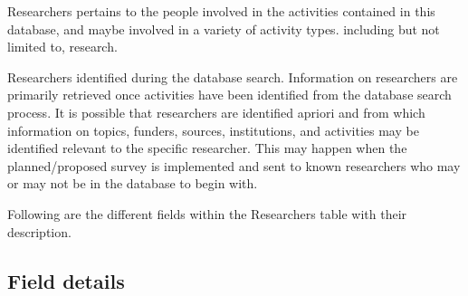 \documentclass[
]{book}
\begin{document}
Researchers pertains to the people involved in the activities contained in this database, and maybe involved in a variety of activity types. including but not limited to, research.

Researchers identified during the database search. Information on researchers are primarily retrieved once activities have been identified from the database search process. It is possible that researchers are identified apriori and from which information on topics, funders, sources, institutions, and activities may be identified relevant to the specific researcher. This may happen when the planned/proposed survey is implemented and sent to known researchers who may or may not be in the database to begin with.

Following are the different fields within the Researchers table with their description.

\hypertarget{field-details-3}{%
\subsection{Field details}\label{field-details-3}}
\end{document}
